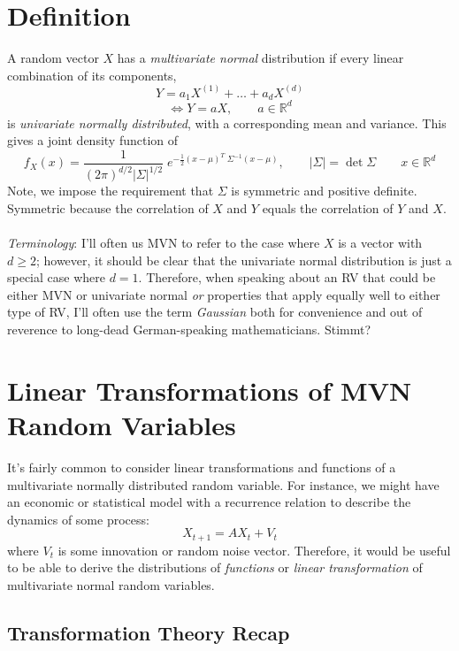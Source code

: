 \documentclass[a4paper,12pt]{scrartcl}
\begin{document}
\newpage
\section{Definition}

A random vector $X$ has a \emph{multivariate normal} 
distribution if every linear combination of its components,
\[ Y = a_1 X^{(1)} + \ldots + a_d X^{(d)} \] 
\[ \Leftrightarrow Y = {a} X, \qquad
    {a} \in \mathbb{R}^{d} \]
is \emph{univariate normally
distributed}, with a corresponding mean and variance. This gives a 
joint density function of 
\begin{equation}
    \label{pdf}
    f_{X}({x}) = \frac{1}{(2\pi)^{d/2}\lvert \Sigma \rvert^{1/2}} 
	\; e^{ -\frac{1}{2} ({x} - \mu)^T \;
	\Sigma^{-1} ({x} - \mu) }, \qquad \lvert\Sigma\rvert =
      \det\Sigma \qquad x \in \mathbb{R}^d
\end{equation}
Note, we impose the requirement that $\Sigma$ is symmetric and positive 
definite.  Symmetric because the correlation of $X$ and $Y$ equals the
correlation of $Y$ and $X$. 
\\
\\
{\sl Terminology}: I'll often us MVN to refer to the case where $X$ is
a vector with $d\geq2$; however, it should be clear that the univariate
normal distribution is just a special case where $d=1$. Therefore,
when speaking about an RV that could be either MVN or univariate normal
\emph{or} properties that apply equally well to either
type of RV, I'll often use the term \emph{Gaussian}
both for convenience and out of reverence to long-dead German-speaking
mathematicians. Stimmt?


\section{Linear Transformations of MVN Random Variables}

It's fairly common to consider linear transformations and functions
of a multivariate normally distributed random variable.  For instance,
we might have an economic or statistical model with a recurrence 
relation to describe the dynamics of some process:
\[ X_{t+1} = A X_{t} + {V}_{t} \]
where ${V}_t$ is some innovation or random noise vector.
Therefore, it would be useful to be able to derive the distributions
of \emph{functions} or \emph{linear transformation} of multivariate 
normal random variables.

\subsection{Transformation Theory Recap}
\end{document}
